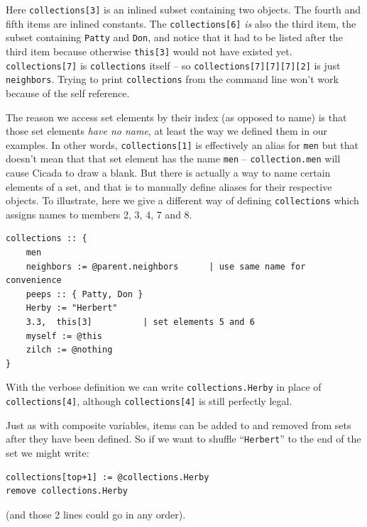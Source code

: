 \documentclass{article}
\newenvironment{code}{
       \begin{list}{}{
               \setlength{\leftmargin}{.4in}
               \setlength{\rightmargin}{0in}
               \setlength{\topsep}{.2in}
       }
       \small
       \item[] }
       { \end{list}   }
\begin{document}
\noindent Here \verb#collections[3]# is an inlined subset containing two objects.  The fourth and fifth items are inlined constants.  The \verb#collections[6]# \emph{is} also the third item, the subset containing \verb#Patty# and \verb#Don#, and notice that it had to be listed after the third item because otherwise \texttt{this[3]} would not have existed yet.  \verb#collections[7]# is \verb#collections# itself -- so \verb#collections[7][7][7][2]# is just \verb#neighbors#.  Trying to print \verb#collections# from the command line won't work because of the self reference.

The reason we access set elements by their index (as opposed to name) is that those set elements \emph{have no name}, at least the way we defined them in our examples.  In other words, \verb#collections[1]# is effectively an alias for \verb#men# but that doesn't mean that that set element has the name \verb#men# -- \texttt{collection.men} will cause Cicada to draw a blank.  But there is actually a way to name certain elements of a set, and that is to manually define aliases for their respective objects.  To illustrate, here we give a different way of defining \texttt{collections} which assigns names to members 2, 3, 4, 7 and 8.

\begin{code} \begin{verbatim}
collections :: {
    men
    neighbors := @parent.neighbors      | use same name for convenience
    peeps :: { Patty, Don }
    Herby := "Herbert"
    3.3,  this[3]          | set elements 5 and 6
    myself := @this
    zilch := @nothing
}
\end{verbatim} \end{code}

\noindent With the verbose definition we can write \texttt{collections.Herby} in place of \texttt{collections[4]}, although \texttt{collections[4]} is still perfectly legal.

Just as with composite variables, items can be added to and removed from sets after they have been defined.  So if we want to shuffle ``\texttt{Herbert}'' to the end of the set we might write:

\begin{code} \begin{verbatim}
collections[top+1] := @collections.Herby
remove collections.Herby
\end{verbatim} \end{code}

\noindent (and those 2 lines could go in any order).
\end{document}
